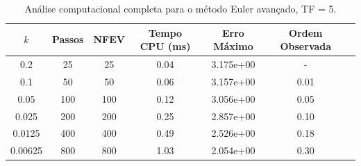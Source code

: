 \begin{table}[H]
    \centering
    \begin{tabular}{ccccccc}
        \hline
        $k$ & Passos & NFEV & Tempo CPU (ms) & Erro Máximo & Ordem Observada \\
        \hline
        0.2 & 25 & 25 & 0.04  & 3.175e+00 & - \\
        0.1 & 50 & 50 & 0.06  & 3.157e+00 & 0.01 \\
        0.05 & 100 & 100 & 0.12  & 3.056e+00 & 0.05 \\
        0.025 & 200 & 200 & 0.25  & 2.857e+00 & 0.10 \\
        0.0125 & 400 & 400 & 0.49  & 2.526e+00 & 0.18 \\
        0.00625 & 800 & 800 & 1.03  & 2.054e+00 & 0.30 \\
        \hline
    \end{tabular}
    \caption{Análise computacional completa para o método Euler avançado, TF = 5.}
    \label{tab:erros_euler_avancado,_tf_=_5}
\end{table}
